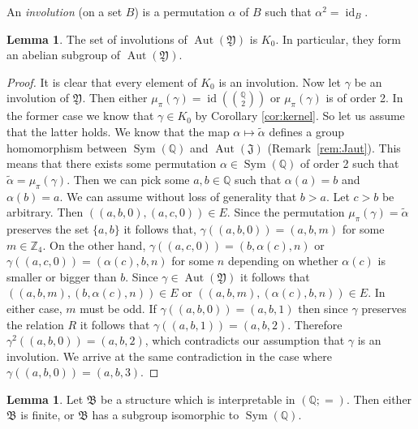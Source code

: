 \documentclass{amsart}
\theoremstyle{definition}
\newtheorem{lemma}[theorem]{Lemma}
\theoremstyle{remark}
\numberwithin{equation}{section}
\newcommand{\aut}{\operatorname{Aut}}
\newcommand{\sym}{\operatorname{Sym}}
\newcommand{\id}{\operatorname{id}}
\newcommand{\atoms}{({\mathbb Q};=)}
\newcommand{\upairs}{{{\mathbb Q}\choose 2}}
\newcommand{\john}{\mathfrak{J}}
\newcommand{\fb}{\mathfrak{B}}
\newcommand{\fy}{\mathfrak{Y}}
\begin{document}
An \emph{involution} (on a set $B$) is a permutation $\alpha$ of $B$ such that $\alpha^2 = \id_B$.

\begin{lemma}\label{invol}
	The set of involutions of $\aut(\fy)$ is $K_0$. In particular, they form an abelian subgroup of $\aut(\fy)$.
\end{lemma}

\begin{proof}
	It is clear that every element of $K_0$ is an involution. Now let $\gamma$ be an involution of $\fy$. Then either $\mu_{\pi}(\gamma)=\id(\upairs)$ or $\mu_{\pi}(\gamma)$ is {of order 2}. In the former case we know that $\gamma\in K_0$ by Corollary \ref{cor:kernel}. So let us assume that {the latter holds}. We know that the map $\alpha\mapsto \tilde{\alpha}$ defines a group homomorphism between $\sym({\mathbb Q})$ and $\aut(\john)$ (Remark~\ref{rem:Jaut}). This means that there exists some {permutation} $\alpha\in \sym({\mathbb Q})$ of order 2 such that $\tilde{\alpha}=\mu_{\pi}(\gamma)$. {Then we can pick some $a,b\in \mathbb{Q}$ such that $\alpha(a)=b$ and $\alpha(b)=a$. We can assume without loss of generality that $b>a$. Let $c>b$ be arbitrary.} Then $((a,b,0),(a,c,0))\in E$. {Since the permutation $\mu_{\pi}(\gamma)=\tilde{\alpha}$ preserves the set $\{a,b\}$ it follows that}, $\gamma((a,b,0))=(a,b,m)$ for some $m \in {\mathbb Z}_4$. {On the other hand}, $\gamma((a,c,0))=(b,\alpha(c),n)$ or $\gamma((a,c,0))=(\alpha(c),b,n)$ for some $n$ depending on whether $\alpha(c)$ is smaller or bigger than $b$. Since $\gamma\in \aut(\fy)$ it follows that {$((a,b,m),(b,\alpha(c),n))\in E$ or $((a,b,m),(\alpha(c),b,n))\in E$. In either case, %
    $m$ must be odd.} If $\gamma((a,b,0))=(a,b,1)$ then since $\gamma$ preserves the relation $R$ it follows that $\gamma((a,b,1))=(a,b,2)$. Therefore $\gamma^2((a,b,0))=(a,b,2)$, which contradicts our assumption that $\gamma$ is an involution. We arrive at the same contradiction in the case where $\gamma((a,b,0))=(a,b,3)$.
\end{proof}

\begin{lemma}\label{when_inter}
	Let $\fb$ be a structure which is interpretable in  $\atoms$. Then either $\fb$ is finite, or $\fb$ has a subgroup isomorphic to $\sym({\mathbb Q})$.
\end{lemma}
	
\end{document}
